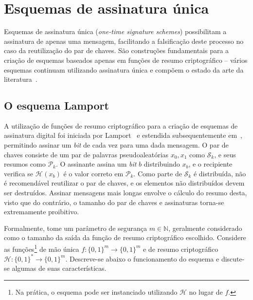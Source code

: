 \documentclass[12pt]{report}
\newcommand{\hh}{\mathcal{H}}
\newcommand{\pk}{\mathcal{P}_k}
\newcommand{\sk}{\mathcal{S}_k}
\newcommand{\hash}[2][]{\mathcal{H}^{#1}(#2)}
\newcommand{\binwds}[1]{\{0, 1\}^{#1}}
\newcommand{\fhash}[1]{\hh{} : \binwds{*} \longrightarrow \binwds{#1}}
\begin{document}
\section{Esquemas de assinatura única}

Esquemas de assinatura única (\emph{one-time signature schemes}) possibilitam a
assinatura de apenas uma mensagem, facilitando a falsificação deste processo no
caso da reutilização do par de chaves. São construções fundamentais para a
criação de esquemas baseados apenas em funções de resumo criptográfico --
vários esquemas continuam utilizando assinatura única e compõem o estado da
arte da literatura~\cite{sphincsplus,irtf-cfrg-xmss-hash-based-signatures-12}.

\subsection{O esquema Lamport}

A utilização de funções de resumo criptográfico para a criação de esquemas de
assinatura digital foi iniciada por Lamport~\cite{lamport1979constructing}
e estendida subsequentemente em~\cite{Diffie:2006:NDC:2263321.2269104, Merkle:1989:CDS:118209.118230},
permitindo assinar um \emph{bit} de cada vez para uma dada mensagem. O par de
chaves consiste de um par de palavras pseudoaleatórias $x_0, x_1$ como $\sk{}$,
e seus resumos como $\pk{}$. O assinante assina um \emph{bit} $b$ distribuindo
$x_b$, e o recipiente verifica se $\hash{x_b}$ é o valor correto em $\pk{}$.
Como parte de $\sk{}$ é distribuída, não é recomendável reutilizar o par de
chaves, e os elementos não distribuídos devem ser destruídos. Assinar mensagens
mais longas envolve o cálculo do resumo desta, visto que do contrário, o
tamanho do par de chaves e assinaturas torna-se extremamente proibitivo.

Formalmente, tome um parâmetro de segurança $m \in \mathbb{N}$, geralmente considerado como o
tamanho da saída da função de resumo criptográfico escolhido. Considere as
funções\footnote{Na prática, o esquema pode ser instanciado utilizando $\hh{}$
no lugar de $f$.} de mão única $f : \binwds{m} \longrightarrow \binwds{m}$ e de
resumo criptográfico $\fhash{m}$.  Descreve-se abaixo o funcionamento do
esquema e discute-se algumas de suas características.
\end{document}
